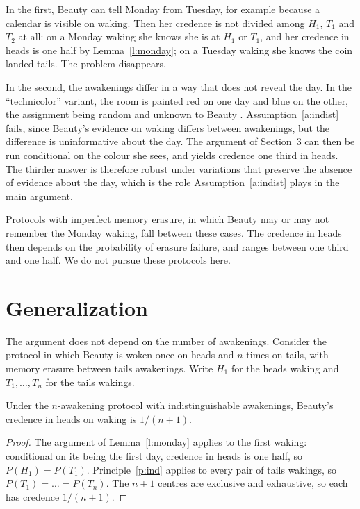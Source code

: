 \documentclass{situationist-preprint}
\begin{document}
In the first, Beauty can tell Monday from Tuesday, for example because a calendar is visible on waking. Then her credence is not divided among $H_1$, $T_1$ and $T_2$ at all: on a Monday waking she knows she is at $H_1$ or $T_1$, and her credence in heads is one half by Lemma~\ref{l:monday}; on a Tuesday waking she knows the coin landed tails. The problem disappears.

In the second, the awakenings differ in a way that does not reveal the day. In the \enquote{technicolor} variant, the room is painted red on one day and blue on the other, the assignment being random and unknown to Beauty \citep{Titelbaum2013}. Assumption~\ref{a:indist} fails, since Beauty's evidence on waking differs between awakenings, but the difference is uninformative about the day. The argument of Section~3 can then be run conditional on the colour she sees, and yields credence one third in heads. The thirder answer is therefore robust under variations that preserve the absence of evidence about the day, which is the role Assumption~\ref{a:indist} plays in the main argument.

Protocols with imperfect memory erasure, in which Beauty may or may not remember the Monday waking, fall between these cases. The credence in heads then depends on the probability of erasure failure, and ranges between one third and one half. We do not pursue these protocols here.

\section{Generalization}

The argument does not depend on the number of awakenings. Consider the protocol in which Beauty is woken once on heads and $n$ times on tails, with memory erasure between tails awakenings. Write $H_1$ for the heads waking and $T_1, \dots, T_n$ for the tails wakings.

\begin{theorem}\label{t:general}
Under the $n$-awakening protocol with indistinguishable awakenings, Beauty's credence in heads on waking is $1/(n+1)$.
\end{theorem}

\begin{proof}
The argument of Lemma~\ref{l:monday} applies to the first waking: conditional on its being the first day, credence in heads is one half, so $P(H_1) = P(T_1)$. Principle~\ref{p:ind} applies to every pair of tails wakings, so $P(T_1) = \dots = P(T_n)$. The $n+1$ centres are exclusive and exhaustive, so each has credence $1/(n+1)$.
\end{proof}
\end{document}
